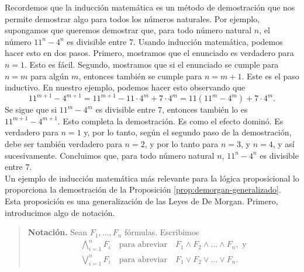 \message{ !name(main.tex)}\documentclass[12pt,a4paper]{book}
\begin{document}
    Recordemos que la inducción matemática es un método de demostración que nos permite demostrar algo para todos los números
    naturales. Por ejemplo, supongamos que queremos demostrar que, para todo número natural $n$, el número $11^{n}-4^{n}$ es
    divisible entre 7. Usando inducción matemática, podemos hacer esto en dos pasos. Primero, mostramos que el enunciado es
    verdadero para $n=1$. Esto es fácil. Segundo, mostramos que si el enunciado se cumple para $n=m$ para algún $m$, entonces
    también se cumple para $n=m+1$. Este es el paso inductivo. En nuestro ejemplo, podemos hacer esto observando que
    \begin{equation*}
        11^{m+1}-4^{m+1}=11^{m+1}-11\cdot 4^{m}+7\cdot 4^{m}=11(11^{m}-4^{m})+7\cdot 4^{m}.
    \end{equation*}
    Se sigue que si $11^{m}-4^{m}$ es divisible entre 7, entonces también lo es $11^{m+1}-4^{m+1}$. Esto completa la
    demostración. Es como el efecto dominó. Es verdadero para $n=1$ y, por lo tanto, según el segundo paso de la demostración,
    debe ser también verdadero para $n=2$, y por lo tanto para $n=3$, y $n=4$, y así sucesivamente. Concluimos que, para todo
    número natural $n$, $11^{n}-4^{n}$ es divisible entre 7.\\
    Un ejemplo de inducción matemática más relevante para la lógica proposicional lo proporciona la demostración de la
    Proposición \ref{prop:demorgan-generalizado}. Esta proposición es una generalización de las Leyes de De Morgan. Primero,
    introducimos algo de notación.

    \begin{quote}
        \textbf{Notación.} Sean $F_{1},\dots,F_{n}$ fórmulas. Escribimos
        \begin{align*}
            \bigwedge_{i=1}^{n}F_{i}\quad\text{para abreviar}\quad F_{1}\wedge F_{2}\wedge\dots\wedge F_{n},\text{ y}\\
            \bigvee_{i=1}^{n}F_{i}\quad\text{para abreviar}\quad F_{1}\vee F_{2}\vee\dots\vee F_{n}.
        \end{align*}
    \end{quote}
\end{document}

